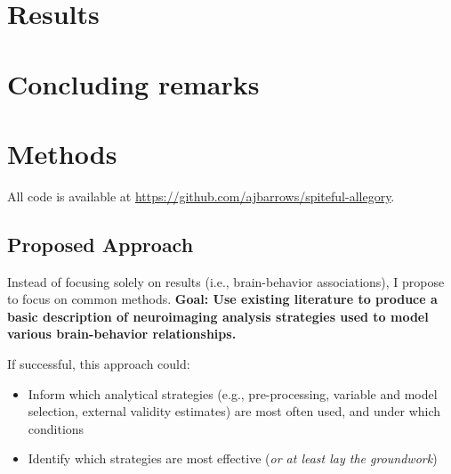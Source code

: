\section{Results}
\label{sec:papertag.results}


\section{Concluding remarks}
\label{sec:papertag.concludingremarks}


\section{Methods}
\label{sec:papertag.methods}

All code is available at \href{https://github.com/ajbarrows/spiteful-allegory}{https://github.com/ajbarrows/spiteful-allegory}.

\subsection{Proposed Approach}

Instead of focusing solely on results (i.e., brain-behavior associations), I propose to focus on common methods. \textbf{Goal: Use existing literature to produce a basic description of neuroimaging analysis strategies used to model various brain-behavior relationships.} 

If successful, this approach could:
\begin{itemize}
	\item Inform which analytical strategies (e.g., pre-processing, variable and model selection, external validity estimates) are most often used, and under which conditions
	\item Identify which strategies are most effective (\textit{or at least lay the groundwork})
\end{itemize}



